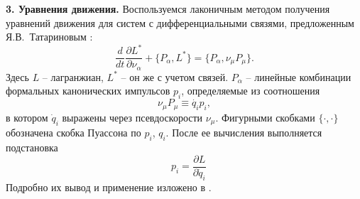 {\bf 3. Уравнения движения.}
Воспользуемся лаконичным методом получения уравнений движения для систем с дифференциальными связями, предложенным Я.В.~Татариновым \cite{Tatarinov}:
\begin{equation}\label{Tatarinov}
    \frac{d}{dt}\frac{\partial L^{*}}{\partial \nu_\alpha}  + \{P_\alpha, L^{*}\} = \{P_\alpha, \nu_\mu P_\mu\}.
\end{equation}
Здесь $L$ -- лагранжиан, $L^*$ -- он же с учетом связей. $P_\alpha$ -- линейные комбинации формальных канонических импульсов $p_i$, определяемые из соотношения 
$$\nu_\mu P_\mu \equiv \dot{q_i} p_i,$$
 в котором $\dot{q}_i$ выражены через псевдоскорости $\nu_\mu$. Фигурными скобками $\{\cdot, \cdot\}$ обозначена скобка Пуассона по $p_i$, $q_i$. После ее вычисления выполняется подстановка 
$$\hspace{10pt} p_i = \frac{\partial L}{\partial \dot{q}_i}$$
Подробно их вывод и применение изложено в \cite{Tatarinov,Zobova2011}.

